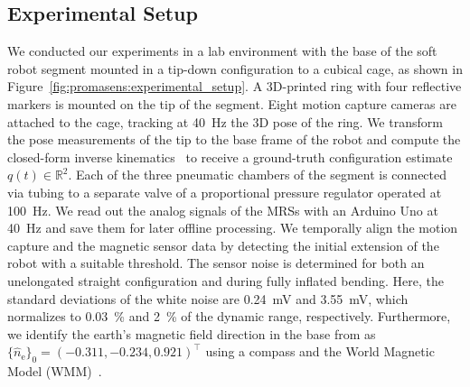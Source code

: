 \subsection{Experimental Setup}
We conducted our experiments in a lab environment with the base of the soft robot segment mounted in a tip-down configuration to a cubical cage, as shown in Figure~\ref{fig:promasens:experimental_setup}.
A 3D-printed ring with four reflective markers is mounted on the tip of the segment.
Eight motion capture cameras are attached to the cage, tracking at \SI{40}{Hz} the 3D pose of the ring.
We transform the pose measurements of the tip to the base frame of the robot and compute the closed-form inverse kinematics~\citep{della2020improved} to receive a ground-truth configuration estimate $q(t) \in \mathbb{R}^2$.
Each of the three pneumatic chambers of the segment is connected via tubing to a separate valve of a proportional pressure regulator operated at \SI{100}{Hz}. %
We read out the analog signals of the \glspl{MRS} with an Arduino Uno at \SI{40}{Hz} and save them for later offline processing. 
We temporally align the motion capture and the magnetic sensor data by detecting the initial extension of the robot with a suitable threshold.
The sensor noise is determined for both an unelongated straight configuration and during fully inflated bending. Here, the standard deviations of the white noise are \SI{0.24}{mV} and \SI{3.55}{mV}, which normalizes to \SI{0.03}{\percent} and \SI{2}{\percent} of the dynamic range, respectively.
Furthermore, we identify the earth's magnetic field direction in the base from as $\{ \hat{n}_{\mathrm{e}} \}_{0} = (-0.311, -0.234, 0.921)^\top$ using a compass and the World Magnetic Model (WMM)~\citep{chulliat2020us}.

